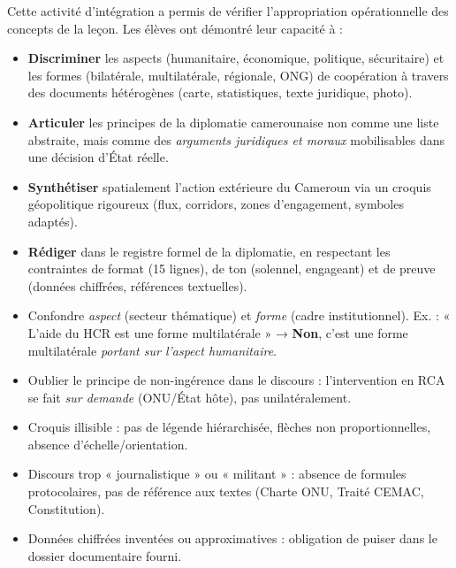 \documentclass[11pt]{article}
\newcommand{\cle}[1]{{\popxbold\color{popdark}#1}}
\newcounter{popsec}
\newcounter{popsub}
\newcommand{\courssub}[1]{%
  \stepcounter{popsub}%
  \par\vspace{9pt}\noindent{\popxbold\fontsize{11.5}{13}\selectfont\color{popink}{\color{poporange}\thepopsec.\thepopsub}\hspace{6pt}#1}\par\nopagebreak\vspace{4pt}
}
\begin{document}
\courssub{Bilan de l'activité}
Cette activité d'intégration a permis de vérifier l'appropriation opérationnelle des concepts de la leçon. Les élèves ont démontré leur capacité à :
\begin{itemize}
    \item \textbf{Discriminer} les \cle{aspects} (humanitaire, économique, politique, sécuritaire) et les \cle{formes} (bilatérale, multilatérale, régionale, ONG) de coopération à travers des documents hétérogènes (carte, statistiques, texte juridique, photo).
    \item \textbf{Articuler} les \cle{principes de la diplomatie camerounaise} non comme une liste abstraite, mais comme des \emph{arguments juridiques et moraux} mobilisables dans une décision d'État réelle.
    \item \textbf{Synthétiser} spatialement l'action extérieure du Cameroun via un croquis géopolitique rigoureux (flux, corridors, zones d'engagement, symboles adaptés).
    \item \textbf{Rédiger} dans le registre formel de la diplomatie, en respectant les contraintes de format (15 lignes), de ton (solennel, engageant) et de preuve (données chiffrées, références textuelles).
\end{itemize}

\begin{attention}
\begin{itemize}
    \item Confondre \emph{aspect} (secteur thématique) et \emph{forme} (cadre institutionnel). Ex. : « L'aide du HCR est une forme multilatérale » → \textbf{Non}, c'est une forme multilatérale \emph{portant sur l'aspect humanitaire}.
    \item Oublier le principe de \cle{non-ingérence} dans le discours : l'intervention en RCA se fait \emph{sur demande} (ONU/État hôte), pas unilatéralement.
    \item Croquis illisible : pas de légende hiérarchisée, flèches non proportionnelles, absence d'échelle/orientation.
    \item Discours trop « journalistique » ou « militant » : absence de formules protocolaires, pas de référence aux textes (Charte ONU, Traité CEMAC, Constitution).
    \item Données chiffrées inventées ou approximatives : obligation de puiser dans le dossier documentaire fourni.
\end{itemize}
\end{attention}
\end{document}
